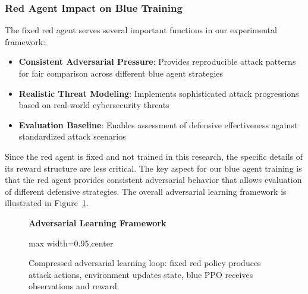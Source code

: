 \documentclass[12pt]{article}
\theoremstyle{definition}
\theoremstyle{plain}
\begin{document}
\subsubsection{Red Agent Impact on Blue Training}
The fixed red agent serves several important functions in our experimental framework:
\begin{itemize}
\item \textbf{Consistent Adversarial Pressure}: Provides reproducible attack patterns for fair comparison across different blue agent strategies
\item \textbf{Realistic Threat Modeling}: Implements sophisticated attack progressions based on real-world cybersecurity threats
\item \textbf{Evaluation Baseline}: Enables assessment of defensive effectiveness against standardized attack scenarios
\end{itemize}

Since the red agent is fixed and not trained in this research, the specific details of its reward structure are less critical. The key aspect for our blue agent training is that the red agent provides consistent adversarial behavior that allows evaluation of different defensive strategies. The overall adversarial learning framework is illustrated in Figure~\ref{fig:adversarial_framework}.

\begin{figure}[H]
\centering
\textbf{Adversarial Learning Framework}
\medskip
\begin{adjustbox}{max width=0.95\linewidth,center}
\end{adjustbox}
\caption{Compressed adversarial learning loop: fixed red policy produces attack actions, environment updates state, blue PPO receives observations and reward.}
\label{fig:adversarial_framework}
\end{figure}
\end{document}
